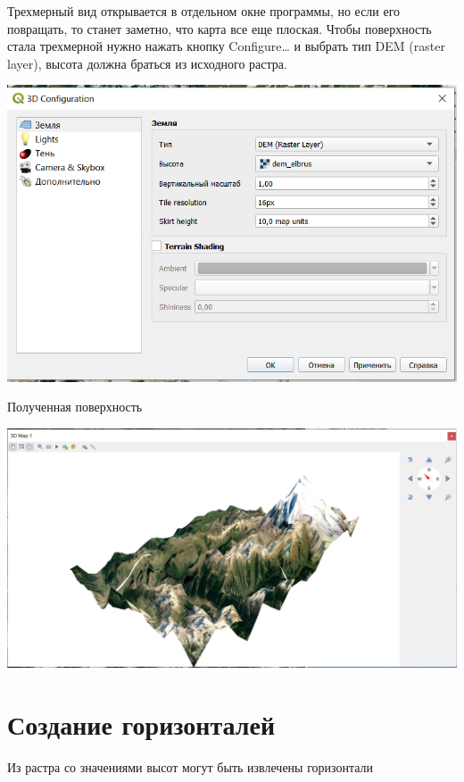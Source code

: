 \documentclass[
]{book}
\begin{document}
Трехмерный вид открывается в отдельном окне программы, но если его повращать, то станет заметно, что карта все еще плоская. Чтобы поверхность стала трехмерной нужно нажать кнопку Configure\ldots{} и выбрать тип DEM (raster layer), высота должна браться из исходного растра.

\includegraphics{figures/80.PNG}

Полученная поверхность

\includegraphics{figures/81.PNG}

\hypertarget{ux441ux43eux437ux434ux430ux43dux438ux435-ux433ux43eux440ux438ux437ux43eux43dux442ux430ux43bux435ux439}{%
\section{Создание горизонталей}\label{ux441ux43eux437ux434ux430ux43dux438ux435-ux433ux43eux440ux438ux437ux43eux43dux442ux430ux43bux435ux439}}

Из растра со значениями высот могут быть извлечены горизонтали
\end{document}
